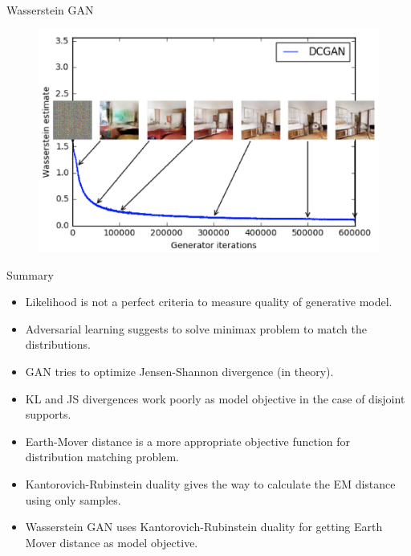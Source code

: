 \begin{frame}{Wasserstein GAN}
\begin{minipage}[t]{0.5\columnwidth}
\begin{figure}
		\end{figure}
	\end{minipage}%
	\begin{minipage}[t]{0.5\columnwidth}
		\begin{figure}
			\centering
			\includegraphics[width=1.0\linewidth]{figs/wgan_quality}
		\end{figure}
	\end{minipage}
	
\end{frame}
\begin{frame}{Summary}
	\begin{itemize}
		\item Likelihood is not a perfect criteria to measure quality of generative model.		
		\vfill
		\item Adversarial learning suggests to solve minimax problem to match the distributions.
		\vfill
		\item GAN tries to optimize Jensen-Shannon divergence (in theory).
		\vfill
		\item KL and JS divergences work poorly as model objective in the case of disjoint supports.
		\vfill
		\item Earth-Mover distance is a more appropriate objective function for distribution matching problem.	
		\vfill
		\item Kantorovich-Rubinstein duality gives the way to calculate the EM distance using only samples.
		\vfill
		\item Wasserstein GAN uses Kantorovich-Rubinstein duality for getting Earth Mover distance as model objective.
	\end{itemize}
\end{frame}

 
